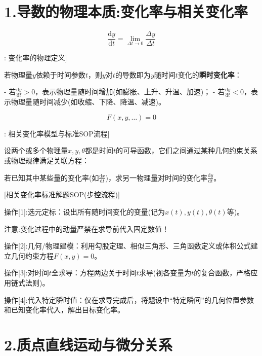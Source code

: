 \documentclass[11pt,a4paper,UTF8]{ctexart}
\begin{document}
\section{1.导数的物理本质:变化率与相关变化率}


\begin{equation*}
\frac{\mathrm{d}y}{\mathrm{d}t} = \lim_{\Delta t \to 0} \frac{\Delta y}{\Delta t}
\end{equation*}
\begin{thmbox}[原理[1]: 变化率的物理定义]

若物理量$y$依赖于时间参数$t$，则$y$对$t$的导数即为$y$随时间$t$变化的\textbf{瞬时变化率}：


- 若$\frac{\mathrm{d}y}{\mathrm{d}t} > 0$，表示物理量随时间增加(如膨胀、上升、升温、加速)；
- 若$\frac{\mathrm{d}y}{\mathrm{d}t} < 0$，表示物理量随时间减少(如收缩、下降、降温、减速)。

\end{thmbox}

\begin{equation*}
F(x, y, \dots) = 0
\end{equation*}
\begin{thmbox}[原理[2]: 相关变化率模型与标准SOP流程]

设两个或多个物理量$x, y, \theta$都是时间$t$的可导函数，它们之间通过某种几何约束关系或物理规律满足关联方程：


若已知其中某些量的变化率(如$\frac{\mathrm{d}x}{\mathrm{d}t}$)，求另一物理量对时间的变化率$\frac{\mathrm{d}y}{\mathrm{d}t}$。

[相关变化率标准解题SOP(步控流程)]

操作[1]:选元定标：设出所有随时间变化的变量(记为$x(t), y(t), \theta(t)$等)。

注意:变化过程中的动量严禁在求导前代入固定数值！

操作[2]:几何/物理建模：利用勾股定理、相似三角形、三角函数定义或体积公式建立几何约束方程$F(x, y) = 0$。

操作[3]:对时间$t$全求导：方程两边关于时间$t$求导(视各变量为$t$的复合函数，严格应用链式法则)。

操作[4]:代入特定瞬时值：仅在求导完成后，将题设中“特定瞬间”的几何位置参数和已知变化率代入，解出目标变化率。

\end{thmbox}

\section{2.质点直线运动与微分关系}
\end{document}

